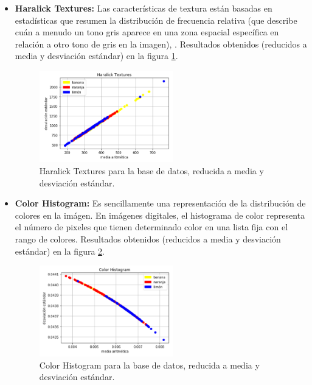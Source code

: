 \documentclass[10pt,a4paper]{article}
\begin{document}
\begin{itemize}
\item \textbf{Haralick Textures:} Las características de textura están basadas en estadísticas  que resumen la distribución de frecuencia relativa (que describe cuán a menudo un tono gris aparece en una zona espacial específica en relación a otro tono de gris en la imagen), \textcite{haralick}. Resultados obtenidos (reducidos a media y desviación estándar) en la figura \ref{haralick_textures}.

\begin{figure}[h]
\centering
\includegraphics[width=0.55\textwidth]{imgs/resultado-04_ht.png}
\caption{Haralick Textures para la base de datos, reducida a media y desviación estándar.}
\label{haralick_textures}
\end{figure}

\item \textbf{Color Histogram:} Es sencillamente una representación de la distribución de colores en la imágen. En imágenes digitales, el histograma de color representa el número de pixeles que tienen determinado color en una lista fija con el rango de colores. Resultados obtenidos (reducidos a media y desviación estándar) en la figura \ref{color_histogram}.

\begin{figure}[h]
\centering
\includegraphics[width=0.55\textwidth]{imgs/resultado-04_ch.png}
\caption{Color Histogram para la base de datos, reducida a media y desviación estándar.}
\label{color_histogram}
\end{figure}

\end{itemize}
\end{document}
